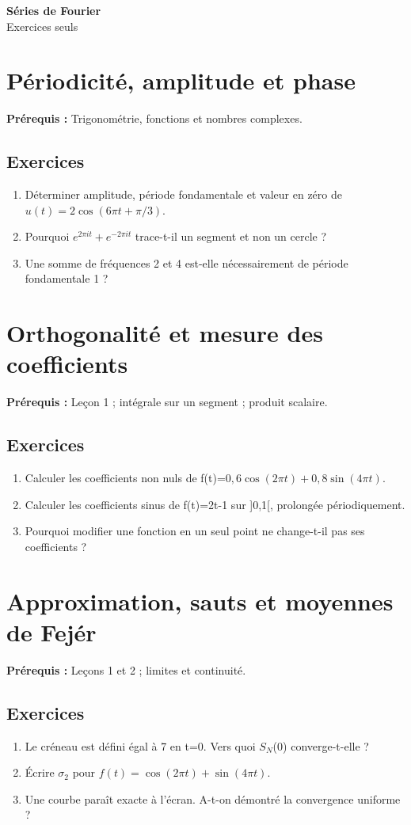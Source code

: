 \documentclass[11pt,a4paper]{article}
\newcommand{\editiontitle}[1]{\begin{center}{\Large\bfseries Séries de Fourier}\\[8pt]#1\end{center}}
\begin{document}
\editiontitle{Exercices seuls}\tableofcontents\clearpage
\section{Périodicité, amplitude et phase}
\textbf{Prérequis :} Trigonométrie, fonctions et nombres complexes.
\subsection*{Exercices}\begin{enumerate}
\item Déterminer amplitude, période fondamentale et valeur en zéro de $u(t)=2\cos(6\pi t+\pi/3)$.
\item Pourquoi $e^{2\pi it}+e^{-2\pi it}$ trace-t-il un segment et non un cercle ?
\item Une somme de fréquences 2 et 4 est-elle nécessairement de période fondamentale 1 ?
\end{enumerate}
\clearpage
\section{Orthogonalité et mesure des coefficients}
\textbf{Prérequis :} Leçon 1 ; intégrale sur un segment ; produit scalaire.
\subsection*{Exercices}\begin{enumerate}
\item Calculer les coefficients non nuls de f(t)=$0{,}6\cos(2\pi t)+0{,}8\sin(4\pi t)$.
\item Calculer les coefficients sinus de f(t)=2t-1 sur ]0,1[, prolongée périodiquement.
\item Pourquoi modifier une fonction en un seul point ne change-t-il pas ses coefficients ?
\end{enumerate}
\clearpage
\section{Approximation, sauts et moyennes de Fejér}
\textbf{Prérequis :} Leçons 1 et 2 ; limites et continuité.
\subsection*{Exercices}\begin{enumerate}
\item Le créneau est défini égal à 7 en t=0. Vers quoi $S_N$(0) converge-t-elle ?
\item Écrire $\sigma_2$ pour $f(t)=\cos(2\pi t)+\sin(4\pi t)$.
\item Une courbe paraît exacte à l’écran. A-t-on démontré la convergence uniforme ?
\end{enumerate}
\clearpage
\end{document}
